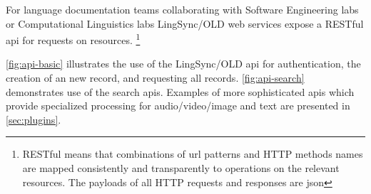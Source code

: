 \documentclass[11pt]{article}
\begin{document}
%
%
%
%
%
%
%
%
For language documentation teams collaborating with Software Engineering labs
or Computational Linguistics labs LingSync/OLD web services expose a RESTful
\gls{api} for requests on resources.%
\footnote{RESTful means that combinations of \gls{url} patterns and HTTP methods
    names are mapped consistently and transparently to operations on the
    relevant resources. The payloads of all HTTP requests and responses are
\gls{json}}

 \autoref{fig:api-basic}
illustrates the use of the LingSync/OLD \gls{api} for authentication, the creation of an new record, and requesting all records. \autoref{fig:api-search} demonstrates use of the search \gls{api}s. Examples of more sophisticated  \gls{api}s which provide specialized processing for audio/video/image and text  are presented in \autoref{sec:plugins}.
\end{document}
